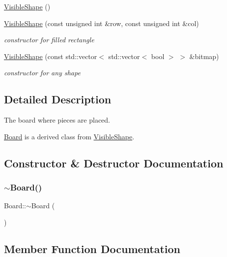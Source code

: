\begin{DoxyCompactItemize}
\mbox{\hyperlink{class_board_a280deeca2a39d227887ff2e13b009c0a}{Visible\+Shape}} ()
\item 
\mbox{\hyperlink{class_board_adc9d11f72af8b96fdb379330fd9de592}{Visible\+Shape}} (const unsigned int \&row, const unsigned int \&col)
\begin{DoxyCompactList}\small\item\em constructor for filled rectangle \end{DoxyCompactList}\item 
\mbox{\hyperlink{class_board_a0efa89e218acbaeaf4f2453467d54cc9}{Visible\+Shape}} (const std\+::vector$<$ std\+::vector$<$ bool $>$ $>$ \&bitmap)
\begin{DoxyCompactList}\small\item\em constructor for any shape \end{DoxyCompactList}\end{DoxyCompactItemize}


\subsection{Detailed Description}
The board where pieces are placed. 

\mbox{\hyperlink{class_board}{Board}} is a derived class from \mbox{\hyperlink{class_visible_shape}{Visible\+Shape}}. 

\subsection{Constructor \& Destructor Documentation}
\mbox{\label{class_board_af73f45730119a1fd8f6670f53f959e68}} 
\subsubsection{\texorpdfstring{$\sim$\+Board()}{~Board()}}
{\footnotesize\ttfamily Board\+::$\sim$\+Board (\begin{DoxyParamCaption}{ }\end{DoxyParamCaption})\hspace{0.3cm}{\ttfamily [virtual]}}



\subsection{Member Function Documentation}
\mbox{\label{class_board_aa4001c8b1e2338fa0dfed7df6f5dcb6b}} 
